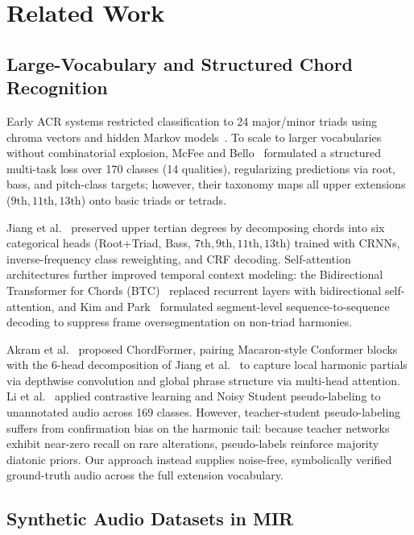 \section{Related Work}\label{sec:related_work}

\subsection{Large-Vocabulary and Structured Chord Recognition}\label{subsec:rw_large_vocab}

Early ACR systems restricted classification to 24 major/minor triads using chroma vectors and hidden Markov models~\cite{pauwels2019twenty,korzeniowski2016feature}. To scale to larger vocabularies without combinatorial explosion, McFee and Bello~\cite{mcfee2017structured} formulated a structured multi-task loss over 170 classes (14 qualities), regularizing predictions via root, bass, and pitch-class targets; however, their taxonomy maps all upper extensions ($9\text{th}, 11\text{th}, 13\text{th}$) onto basic triads or tetrads.

Jiang et al.~\cite{jiang2019large} preserved upper tertian degrees by decomposing chords into six categorical heads (Root+Triad, Bass, $7\text{th}, 9\text{th}, 11\text{th}, 13\text{th}$) trained with CRNNs, inverse-frequency class reweighting, and CRF decoding. Self-attention architectures further improved temporal context modeling: the Bidirectional Transformer for Chords (BTC)~\cite{park2019btc} replaced recurrent layers with bidirectional self-attention, and Kim and Park~\cite{kim2026event} formulated segment-level sequence-to-sequence decoding to suppress frame oversegmentation on non-triad harmonies.

Akram et al.~\cite{akram2026chordformer} proposed ChordFormer, pairing Macaron-style Conformer blocks~\cite{gulati2020conformer} with the 6-head decomposition of Jiang et al.~\cite{jiang2019large} to capture local harmonic partials via depthwise convolution and global phrase structure via multi-head attention. Li et al.~\cite{li2025large} applied contrastive learning and Noisy Student pseudo-labeling to unannotated audio across 169 classes. However, teacher-student pseudo-labeling suffers from confirmation bias on the harmonic tail: because teacher networks exhibit near-zero recall on rare alterations, pseudo-labels reinforce majority diatonic priors. Our approach instead supplies noise-free, symbolically verified ground-truth audio across the full extension vocabulary.

\subsection{Synthetic Audio Datasets in MIR}\label{subsec:rw_synthetic_audio}

